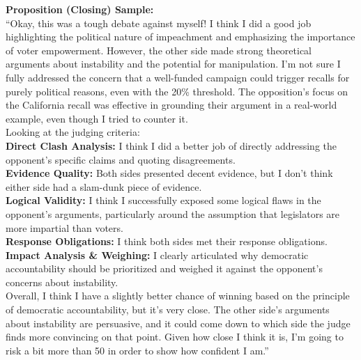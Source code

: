\documentclass{article}
\begin{document}
\begin{tcolorbox}[
  colback=white,
  colframe=black,
  boxrule=0.5pt,
  arc=0pt,
  left=6pt,
  right=6pt,
  top=6pt,
  bottom=6pt
  ]
  \noindent\textbf{Proposition (Closing) Sample:}\\
  ``Okay, this was a tough debate against myself! I think I did a good job highlighting the political nature of impeachment and emphasizing the importance of voter empowerment. However, the other side made strong theoretical arguments about instability and the potential for manipulation. I'm not sure I fully addressed the concern that a well-funded campaign could trigger recalls for purely political reasons, even with the 20\% threshold. The opposition's focus on the California recall was effective in grounding their argument in a real-world example, even though I tried to counter it.\\
  
  Looking at the judging criteria:\\
  \textbf{Direct Clash Analysis:} I think I did a better job of directly addressing the opponent's specific claims and quoting disagreements.\\
  \textbf{Evidence Quality:} Both sides presented decent evidence, but I don't think either side had a slam-dunk piece of evidence.\\
  \textbf{Logical Validity:} I think I successfully exposed some logical flaws in the opponent's arguments, particularly around the assumption that legislators are more impartial than voters.\\
  \textbf{Response Obligations:} I think both sides met their response obligations.\\
  \textbf{Impact Analysis \& Weighing:} I clearly articulated why democratic accountability should be prioritized and weighed it against the opponent's concerns about instability.\\
  
  Overall, I think I have a slightly better chance of winning based on the principle of democratic accountability, but it's very close. The other side's arguments about instability are persuasive, and it could come down to which side the judge finds more convincing on that point. Given how close I think it is, I'm going to risk a bit more than 50 in order to show how confident I am.''
  \end{tcolorbox}
  
\end{document}
